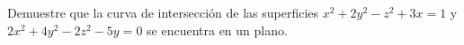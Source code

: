 \item Demuestre que la curva de intersección de las superficies $x^2 + 2y^2 - z^2 + 3x = 1$ y $2x^2 + 4y^2 - 2z^2 - 5y = 0$ se encuentra en un plano.
